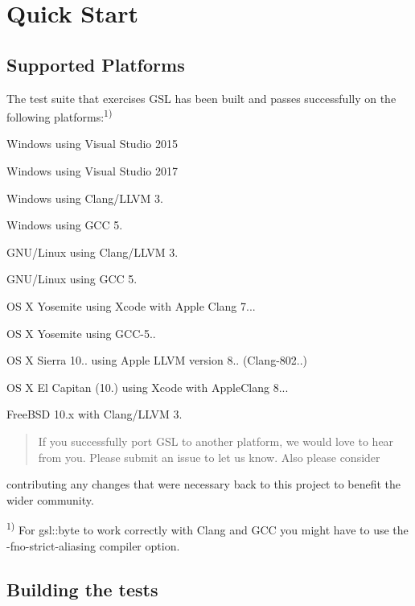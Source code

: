\section*{Quick Start}

\subsection*{Supported Platforms}

The test suite that exercises G\+SL has been built and passes successfully on the following platforms\+:\textsuperscript{1)}


\begin{DoxyItemize}
\item Windows using Visual Studio 2015
\item Windows using Visual Studio 2017
\item Windows using Clang/\+L\+L\+VM 3.
\item Windows using G\+CC 5.
\item G\+N\+U/\+Linux using Clang/\+L\+L\+VM 3.
\item G\+N\+U/\+Linux using G\+CC 5.
\item OS X Yosemite using Xcode with Apple Clang 7...
\item OS X Yosemite using G\+C\+C-\/5..
\item OS X Sierra 10.. using Apple L\+L\+VM version 8.. (Clang-\/802..)
\item OS X El Capitan (10.) using Xcode with Apple\+Clang 8...
\item Free\+B\+SD 10.\+x with Clang/\+L\+L\+VM 3.
\end{DoxyItemize}

\begin{quote}
If you successfully port G\+SL to another platform, we would love to hear from you. Please submit an issue to let us know. Also please consider \end{quote}
contributing any changes that were necessary back to this project to benefit the wider community.

\textsuperscript{1)} For {\ttfamily gsl\+::byte} to work correctly with Clang and G\+CC you might have to use the {\ttfamily -\/fno-\/strict-\/aliasing} compiler option.

\subsection*{Building the tests}


